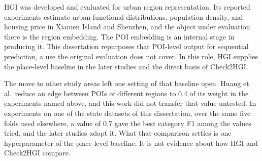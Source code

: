 HGI was developed and evaluated for urban region representation. Its reported
experiments estimate urban functional distributions, population density, and housing
price in Xiamen Island and Shenzhen, and the object under evaluation there is the
region embedding. The POI embedding is an internal stage in producing it. This
dissertation repurposes that POI-level output for sequential prediction, a use the
original evaluation does not cover. In this role, HGI supplies the place-level
baseline in the later studies and the direct basis of Check2HGI.

The move to other study areas left one setting of that baseline open. Huang et al.\
reduce an edge between POIs of different regions to 0.4 of its weight in the
experiments named above, and this work did not transfer that value untested. In
experiments on one of the state datasets of this dissertation, over the same five
folds used elsewhere, a value of 0.7 gave the best category F1 among the values tried,
and the later studies adopt it. What that comparison settles is one hyperparameter of
the place-level baseline. It is not evidence about how HGI and Check2HGI compare.
